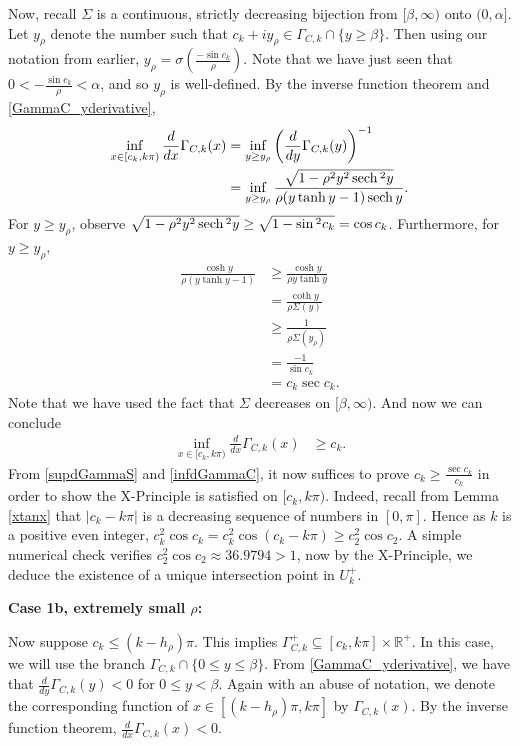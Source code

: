 \documentclass{amsart}
\theoremstyle{plain}
\numberwithin{theorem}{section}
\DeclareMathOperator{\sech}{sech}
\theoremstyle{definition}
\theoremstyle{remark}
\theoremstyle{brakets}
\newcommand{\R}{\mathbb{R}}
\begin{document}
Now, recall $\Sigma$ is a continuous, strictly decreasing bijection from $[\beta, \infty)$ onto $(0,\alpha]$. Let $y_\rho$ denote the number such that $c_k +iy_\rho \in \Gamma_{C,k} \cap \{y \geq \beta\}$. Then using our notation from earlier, $y_\rho = \sigma(\frac{-\sin c_k}{\rho})$. Note that we have just seen that $0 < -\frac{\sin c_k}{\rho } < \alpha$, and so $y_\rho$ is well-defined.  By the inverse function theorem and \eqref{GammaC_yderivative}, 
\begin{align*}
    \inf\limits_{x \in [c_k,k\pi)} \frac{d}{dx} \Gamma_{C,k}(x) &=  \inf\limits_{y \geq y_\rho} \left( \frac{d}{dy} \Gamma_{C,k}(y) \right)^{-1} \nonumber \\
    &= \inf\limits_{y \geq y_\rho} \frac{\sqrt{1 - \rho^2 y^2 \sech\mathstrut^2 y}}{\rho ( y\tanh y-1) \sech y}.
\end{align*}
\noindent For $y \geq y_\rho$, observe $\sqrt{1 - \rho^2 y^2 \sech\mathstrut^2 y} \geq \sqrt{1-\sin\mathstrut^2 c_k} = \cos c_k$. Furthermore, for $y \geq y_\rho,$
\begin{align*}
    \frac{\cosh y}{\rho(y\tanh y - 1)} &\geq \frac{\cosh y}{\rho y\tanh y} \\
    &= \frac{\coth y}{\rho \Sigma(y)} \\
    &\geq \frac{1}{\rho\Sigma(y_\rho)} \\
    &= \frac{-1}{\sin c_k} \\
    &= c_k \sec c_k.
\end{align*}
\noindent Note that we have used the fact that $\Sigma$ decreases on $[\beta, \infty)$. And now we can conclude 
\begin{align}
    \inf\limits_{x \in [c_k,k\pi)} \frac{d}{dx} \Gamma_{C,k}(x) &\geq c_k. \label{infdGammaC}
\end{align}
From \eqref{supdGammaS} and \eqref{infdGammaC}, it now suffices to prove $c_k \geq \frac{\sec c_k}{c_k}$ in order to show the X-Principle is satisfied on $[c_k, k\pi)$. Indeed, recall from Lemma \ref{xtanx} that $|c_k - k\pi|$ is a decreasing sequence of numbers in $[0,\pi]$. Hence as $k$ is a positive even integer, $c_k^2\cos c_k = c_k^2\cos(c_k - k\pi) \geq c_2^2\cos c_2.$ A simple numerical check verifies $c_2^2 \cos c_2 \approx 36.9794 > 1$, now by the X-Principle, we deduce the existence of a unique intersection point in $U_k^+$.
 

\noindent \textbf{Case 1b, extremely small $\rho$:}

Now suppose $c_k \leq (k-h_\rho)\pi$.  This implies $\Gamma_{C,k}^+ \subseteq [c_k,k\pi]\times \R^+$. In this case, we will use the branch $\Gamma_{C,k} \cap \{0 \leq y \leq \beta\}$. From \eqref{GammaC_yderivative}, we have that $\frac{d}{dy}\Gamma_{C,k}(y) < 0$ for $0 \leq y < \beta$. Again with an abuse of notation, we denote the corresponding function of $x \in [(k-h_\rho)\pi,k\pi]$ by $\Gamma_{C,k}(x)$. By the inverse function theorem, $\frac{d}{dx}\Gamma_{C,k}(x) < 0$.
\end{document}

